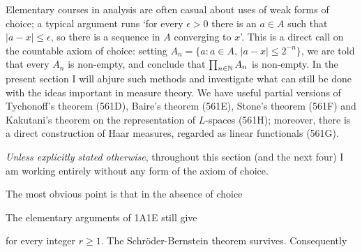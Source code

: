 
\def\chaptername{Choice and determinacy}
\def\sectionname{Analysis without choice}


Elementary courses in analysis
are often casual about uses of weak forms of choice;  a typical argument
runs `for every $\epsilon>0$ there is an $a\in A$ such that
$|a-x|\le\epsilon$, so there is a sequence in $A$ converging to $x$'.
This is a direct call on the countable axiom of choice:  setting
$A_n=\{a:a\in A$, $|a-x|\le 2^{-n}\}$, we are told that every $A_n$ is
non-empty, and conclude that $\prod_{n\in\Bbb N}A_n$ is non-empty.   In the
present section I will abjure such methods and investigate what can
still be done with the ideas important in measure theory.
We have useful partial versions of Tychonoff's theorem (561D), Baire's
theorem (561E), Stone's theorem (561F) and Kakutani's theorem on the
representation of $L$-spaces (561H);  moreover, there is a direct
construction of Haar measures, regarded as linear functionals (561G).

{\it Unless explicitly stated otherwise}, throughout this section (and the
next four) I am working entirely without any form of the axiom of choice.

The most obvious point is that in the absence of choice


\noindent{}The elementary arguments of 1A1E
still give




\noindent for every integer $r\ge 1$.   The Schr\"oder-Bernstein theorem
survives.
Consequently

